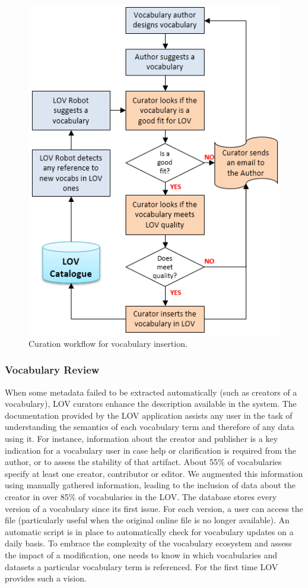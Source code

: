 \documentclass{iosart2c}
\begin{document}
\begin{figure}[ht!b]
\includegraphics[scale=0.6]{workflow-curation-suggest.png}
\caption{Curation workflow for vocabulary insertion.}
\label{fig:arch}
\end{figure}

	\subsubsection{Vocabulary Review}
When some metadata failed to be extracted automatically (such as creators of a vocabulary), LOV curators enhance the description available in the system. The documentation provided by the LOV application assists any user in the task of understanding the semantics of each vocabulary term and therefore of any data using it. For instance, information about the creator and publisher is a key indication for a vocabulary user in case help or clarification is required from the author, or to assess the stability of that artifact. About 55\% of vocabularies specify at least one creator, contributor or editor. We augmented this information using manually gathered information, leading to the inclusion of data about the creator in over 85\% of vocabularies in the LOV. The database stores every version of a vocabulary since its first issue. For each version, a user can access the file (particularly useful when the original online file is no longer available). An automatic script is in place to automatically check for vocabulary updates on a daily basis. To embrace the complexity of the vocabulary ecosystem and assess the impact of a modification, one needs to know in which vocabularies and datasets a particular vocabulary term is referenced. For the first time LOV provides such a vision. 
\end{document}
